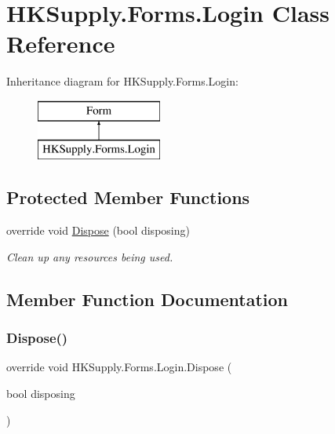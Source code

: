\hypertarget{class_h_k_supply_1_1_forms_1_1_login}{}\section{H\+K\+Supply.\+Forms.\+Login Class Reference}
\label{class_h_k_supply_1_1_forms_1_1_login}
Inheritance diagram for H\+K\+Supply.\+Forms.\+Login\+:\begin{figure}[H]
\begin{center}
\leavevmode
\includegraphics[height=2.000000cm]{class_h_k_supply_1_1_forms_1_1_login}
\end{center}
\end{figure}
\subsection*{Protected Member Functions}
\begin{DoxyCompactItemize}
\item 
override void \mbox{\hyperlink{class_h_k_supply_1_1_forms_1_1_login_a0c20fcbe198d2635836e7c7c6eebee31}{Dispose}} (bool disposing)
\begin{DoxyCompactList}\small\item\em Clean up any resources being used. \end{DoxyCompactList}\end{DoxyCompactItemize}


\subsection{Member Function Documentation}
\mbox{\label{class_h_k_supply_1_1_forms_1_1_login_a0c20fcbe198d2635836e7c7c6eebee31}} 
\subsubsection{\texorpdfstring{Dispose()}{Dispose()}}
{\footnotesize\ttfamily override void H\+K\+Supply.\+Forms.\+Login.\+Dispose (\begin{DoxyParamCaption}\item[{bool}]{disposing }\end{DoxyParamCaption})\hspace{0.3cm}{\ttfamily [protected]}}




